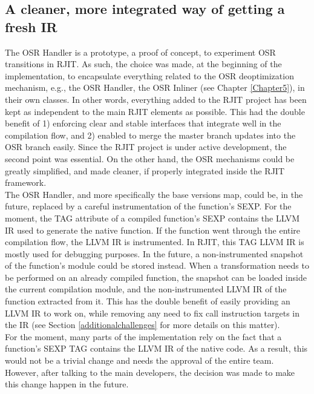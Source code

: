 \subsection{A cleaner, more integrated way of getting a fresh IR}

The OSR Handler is a prototype, a proof of concept, to experiment OSR transitions in RJIT. 
As such, the choice was made, at the beginning of the implementation, to encapsulate everything related to the OSR deoptimization mechanism, e.g., the OSR Handler, the OSR Inliner (see Chapter \ref{Chapter5}), in their own classes.
In other words, everything added to the RJIT project has been kept as independent to the main RJIT elements as possible.
This had the double benefit of 1) enforcing clear and stable interfaces that integrate well in the compilation flow, and 2) enabled to merge the master branch updates into the OSR branch easily.
Since the RJIT project is under active development, the second point was essential.
On the other hand, the OSR mechanisms could be greatly simplified, and made cleaner, if properly integrated inside the RJIT framework.\\

The OSR Handler, and more specifically the base versions map, could be, in the future, replaced by a careful instrumentation of the function's SEXP. 
For the moment, the TAG attribute of a compiled function's SEXP contains the LLVM IR used to generate the native function.
If the function went through the entire compilation flow, the LLVM IR is instrumented. 
In RJIT, this TAG LLVM IR is mostly used for debugging purposes.
In the future, a non-instrumented snapshot of the function's module could be stored instead.
When a transformation needs to be performed on an already compiled function, the snapshot can be loaded inside the current compilation module, and the non-instrumented LLVM IR of the function extracted from it.
This has the double benefit of easily providing an LLVM IR to work on, while removing any need to fix call instruction targets in the IR (see Section \ref{additionalchallenges} for more details on this matter).\\

For the moment, many parts of the implementation rely on the fact that a function's SEXP TAG contains the LLVM IR of the native code. 
As a result, this would not be a trivial change and needs the approval of the entire team.
However, after talking to the main developers, the decision was made to make this change happen in the future.\\